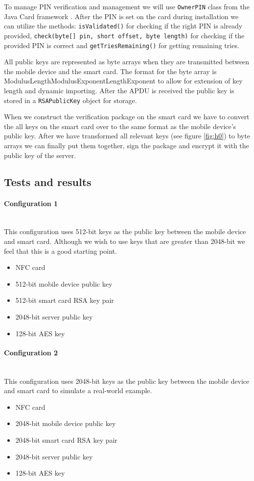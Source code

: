 To manage PIN verification and management we will use \texttt{OwnerPIN} class from the Java Card framework \cite{ownerpin}. After the PIN is set on the card during installation we can utilize the methods: \texttt{isValidated()} for checking if the right PIN is already provided, \texttt{check(byte[] pin, short offset, byte length)} for checking if the provided PIN is correct and \texttt{getTriesRemaining()} for getting remaining tries.

All public keys are represented as byte arrays when they are transmitted between the mobile device and the smart card. The format for the byte array is \textbar{}ModulusLength\textbar{}Modulus\textbar{}ExponentLength\textbar{}Exponent\textbar{} to allow for extension of key length and dynamic importing. After the APDU is received the public key is stored in a \texttt{RSAPublicKey} object for storage.

When we construct the verification package on the smart card we have to convert the all keys on the smart card over to the same format as the mobile device's public key. After we have transformed all relevant keys (see figure \ref{fig:h0}) to byte arrays we can finally put them together, sign the package and encrypt it with the public key of the server.

\subsection{Tests and results}
\paragraph{Configuration 1}\mbox{}\\
This configuration uses 512-bit keys as the public key between the mobile device and smart card. Although we wish to use keys that are greater than 2048-bit we feel that this is a good starting point.
\begin{itemize}
    \item NFC card
    \item 512-bit mobile device public key
    \item 512-bit smart card RSA key pair
    \item 2048-bit server public key
    \item 128-bit AES key
\end{itemize}

\paragraph{Configuration 2}\mbox{}\\
This configuration uses 2048-bit keys as the public key between the mobile device and smart card to simulate a real-world example.
\begin{itemize}
    \item NFC card
    \item 2048-bit mobile device public key
    \item 2048-bit smart card RSA key pair
    \item 2048-bit server public key
    \item 128-bit AES key
\end{itemize}


